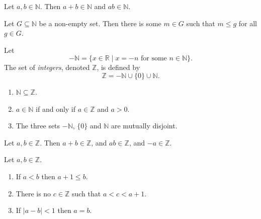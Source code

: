 \begin{lemma} %
	Let $a, b \in \mathbb{N}$. Then $a + b \in \mathbb{N}$ and $a b \in \mathbb{N}$.
\end{lemma}

\begin{theorem} %
	Let $G \subseteq \mathbb{N}$ be a non-empty set. Then there is some $m \in G$ such that $m \leq g$ for all $g \in G$.
\end{theorem}

\begin{definition} %
	Let
	$$
		-\mathbb{N} = \{x \in \mathbb{R} \mid x = -n \text{ for some } n \in \mathbb{N} \}.
	$$
	The set of \emph{integers}, denoted $\mathbb{Z}$, is defined by
	$$
		\mathbb{Z} =-\mathbb{N} \cup \{ 0 \} \cup \mathbb{N}.
	$$
\end{definition}

\begin{lemma} %
	\label{nir:l:nat_int_rel}
	\hfill

	\begin{enumerate}
		\item \label{nir:l:nat_int_rel:1}
		      $\mathbb{N} \subseteq \mathbb{Z}$.
		\item \label{nir:l:nat_int_rel:2}
		      $a \in \mathbb{N}$ if and only if $a \in \mathbb{Z}$ and $a > 0$.
		\item \label{nir:l:nat_int_rel:3}
		      The three sets $-\mathbb{N}$, $\{0\}$ and $\mathbb{N}$ are mutually disjoint.
	\end{enumerate}
\end{lemma}

\begin{lemma} %
	\label{nir:l:int_closed}

	Let $a, b \in \mathbb{Z}$. Then $a + b \in \mathbb{Z}$, and $a b \in \mathbb{Z}$, and $-a \in \mathbb{Z}$.
\end{lemma}

\begin{theorem} %
	\label{nir:t:int_discr}

	Let $a, b \in \mathbb{Z}$.
	\begin{enumerate}
		\item \label{nir:t:int_discr:1}
		      If $a < b$ then $a + 1 \leq b$.
		\item \label{nir:t:int_discr:2}
		      There is no $c \in \mathbb{Z}$ such that $a < c < a + 1$.
		\item \label{nir:t:int_discr:3}
		      If $|a - b| < 1$ then $a = b$.
	\end{enumerate}
\end{theorem}

